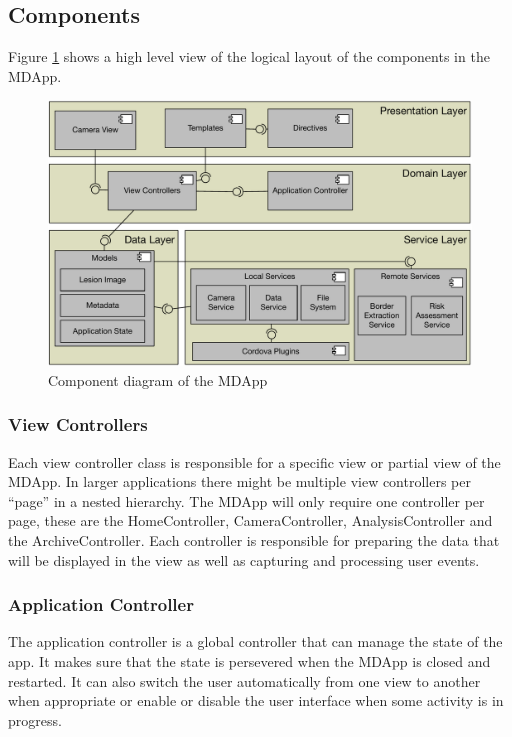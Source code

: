 \subsection{Components}

Figure \ref{fig:comp_dia} shows a high level view of the logical layout of the components in the MDApp.

\begin{figure}[H]
    \centering
    \includegraphics[width=\textwidth,keepaspectratio]{assets/architecture/compontent_diagram.pdf}
    \caption{Component diagram of the MDApp}
    \label{fig:comp_dia}
\end{figure}

\subsubsection{View Controllers}

Each view controller class is responsible for a specific view or partial view of the MDApp. In larger applications there might be multiple view controllers per “page” in a nested hierarchy. The MDApp will only require one controller per page, these are the HomeController, CameraController, AnalysisController and the ArchiveController. Each controller is responsible for preparing the data that will be displayed in the view as well as capturing and processing user events.

\subsubsection{Application Controller}
The application controller is a global controller that can manage the state of the app. It makes sure that the state is persevered when the MDApp is closed and restarted. It can also switch the user automatically from one view to another when appropriate or enable or disable the user interface when some activity is in progress.

